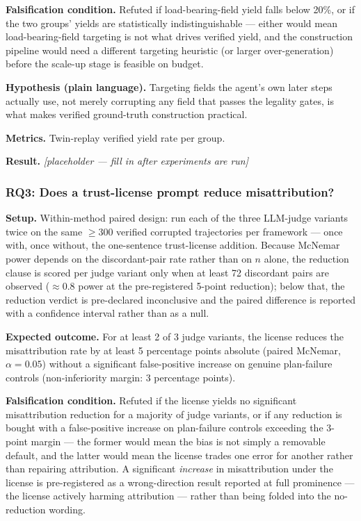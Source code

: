 \documentclass[11pt]{article}
\newcommand{\ph}{\textit{[placeholder --- fill in after experiments are run]}}
\begin{document}
\textbf{Falsification condition.} Refuted if load-bearing-field yield falls below 20\%, or if the two groups' yields are statistically indistinguishable --- either would mean load-bearing-field targeting is not what drives verified yield, and the construction pipeline would need a different targeting heuristic (or larger over-generation) before the scale-up stage is feasible on budget.

\textbf{Hypothesis (plain language).} Targeting fields the agent's own later steps actually use, not merely corrupting any field that passes the legality gates, is what makes verified ground-truth construction practical.

\textbf{Metrics.} Twin-replay verified yield rate per group.

\textbf{Result.} \ph

\subsubsection{RQ3: Does a trust-license prompt reduce misattribution?}
\textbf{Setup.} Within-method paired design: run each of the three LLM-judge variants twice on the same $\geq 300$ verified corrupted trajectories per framework --- once with, once without, the one-sentence trust-license addition. Because McNemar power depends on the discordant-pair rate rather than on $n$ alone, the reduction clause is scored per judge variant only when at least 72 discordant pairs are observed ($\approx$0.8 power at the pre-registered 5-point reduction); below that, the reduction verdict is pre-declared inconclusive and the paired difference is reported with a confidence interval rather than as a null.

\textbf{Expected outcome.} For at least 2 of 3 judge variants, the license reduces the misattribution rate by at least 5 percentage points absolute (paired McNemar, $\alpha = 0.05$) without a significant false-positive increase on genuine plan-failure controls (non-inferiority margin: 3 percentage points).

\textbf{Falsification condition.} Refuted if the license yields no significant misattribution reduction for a majority of judge variants, or if any reduction is bought with a false-positive increase on plan-failure controls exceeding the 3-point margin --- the former would mean the bias is not simply a removable default, and the latter would mean the license trades one error for another rather than repairing attribution. A significant \emph{increase} in misattribution under the license is pre-registered as a wrong-direction result reported at full prominence --- the license actively harming attribution --- rather than being folded into the no-reduction wording.
\end{document}
